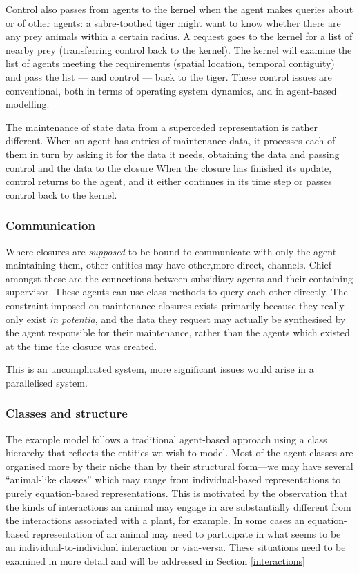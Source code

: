 Control also passes from agents to the kernel when the agent makes
queries about or of other agents: a sabre-toothed tiger might want to
know whether there are any prey animals within a certain radius.  A
request goes to the kernel for a list of nearby prey (transferring
control back to the kernel).  The kernel will examine the list of
agents meeting the requirements (spatial location, temporal
contiguity) and pass the list --- and control --- back to the tiger.
These control issues are conventional, both in terms of operating
system dynamics, and in agent-based modelling.

The maintenance of state data from a superceded representation is
rather different. When an agent has entries of maintenance data, it
processes each of them in turn by asking it for the data it needs,
obtaining the data and passing control and the data to the closure
When the closure has finished its update, control returns to the
agent, and it either continues in its time step or passes control back
to the kernel.

\subsubsection{Communication}

Where closures are \emph{supposed} to be bound to communicate with
only the agent maintaining them, other entities may have other,more
direct, channels. Chief amongst these are the connections between
subsidiary agents and their containing supervisor.  These agents can
use class methods to query each other directly. The constraint imposed
on maintenance closures exists primarily because they really only
exist \emph{in potentia}, and the data they request may actually be
synthesised by the agent responsible for their maintenance, rather
than the agents which existed at the time the closure was created.

This is an uncomplicated system, more significant issues would arise
in a parallelised system.  


\subsubsection{Classes and structure}

The example model follows a traditional agent-based approach using a
class hierarchy that reflects the entities we wish to model. Most of
the agent classes are organised more by their niche than by their
structural form---we may have several ``animal-like classes'' which
may range from individual-based representations to purely
equation-based representations. This is motivated by the observation
that the kinds of interactions an animal may engage in are
substantially different from the interactions associated with a plant,
for example.  In some cases an equation-based representation of an
animal may need to participate in what seems to be an
individual-to-individual interaction or visa-versa.  These situations
need to be examined in more detail and will be addressed in Section
\ref{interactions}


